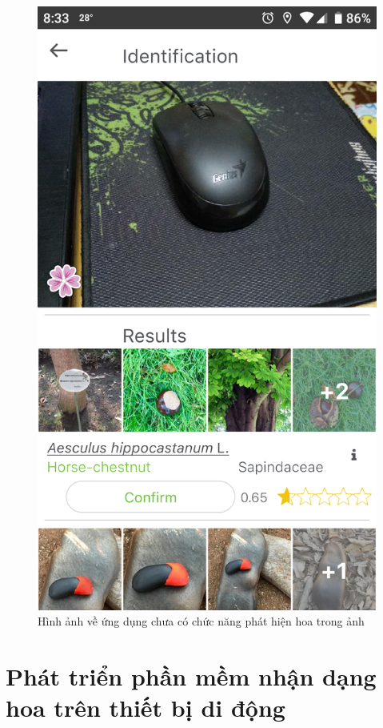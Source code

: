 \documentclass[12pt]{report}
\begin{document}
\begin{figure}[h]
			\includegraphics[scale=0.13]{app_detect2}
			\caption{Hình ảnh về ứng dụng chưa có chức năng phát hiện hoa trong ảnh}
			\label{fig:app_detect}
		\end{figure}
																		
																				
		\newpage
		\chapter{Phát triển phần mềm nhận dạng hoa trên thiết bị di động}
		\label{chap:solution}
																
\end{document}
